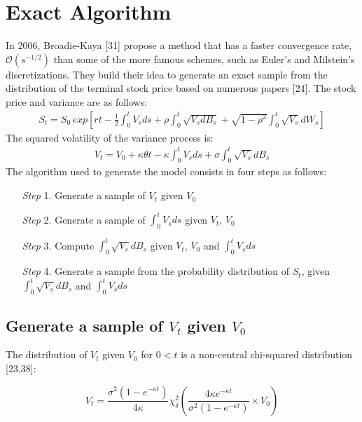 \documentclass[12pt,oneside]{reedthesis}
\theoremstyle{definition}
\theoremstyle{definition}
\theoremstyle{remark}
\begin{document}
  \section{Exact Algorithm}\label{exact-algorithm}
  
  In 2006, Broadie-Kaya {[}31{]} propose a method that has a faster
  convergence rate, \(\mathcal{O} \left( s^{-1/2} \right)\) than some of
  the more famous schemes, such as Euler's and Milstein's discretizations.
  They build their idea to generate an exact sample from the distribution
  of the terminal stock price based on numerous papers {[}24{]}. The stock
  price and variance are as follows:
  \begin{align} \label{eq:ea1}
  S_t = S_0 \, exp \left[ r t - \frac{1}{2} \int_{0}^{t}{V_s ds} + \rho  \int_{0}^{t}{\sqrt{V_s d B_s}} + \sqrt{1 - \rho^2} \int_{0}^{t}{\sqrt{V_s} dW_s}\right]
  \end{align}
  The squared volatility of the variance process is:
  \begin{align} \label{eq:ea2}
  V_t = V_0 + \kappa \theta t - \kappa \int_{0}^{t}{V_s ds} + \sigma \int_{0}^{t}{\sqrt{V_s} dB_s}
  \end{align}
  The algorithm used to generate the model consists in four steps as
  follows:
  \begin{itemize}
  \item [\textit{Step} 1.] Generate a sample of $V_t$ given $V_0$
  \item [\textit{Step} 2.] Generate a sample of $\displaystyle \int_0^t V_sds$ given $V_t$, $V_0$
  \item [\textit{Step} 3.] Compute $\displaystyle \int_0^t \sqrt{V_s}dB_s$ given $V_t$, $V_0$ and $\int_0^t V_sds$
  \item [\textit{Step} 4.] Generate a sample from the probability distribution of $S_t$, given $\displaystyle \int_0^t \sqrt{V_s}dB_s$ and $\displaystyle \int_0^t V_sds$
  \end{itemize}
  \subsection{\texorpdfstring{Generate a sample of \(V_t\) given
  \(V_0\)}{Generate a sample of V\_t given V\_0}}\label{generate-a-sample-of-v_t-given-v_0}
  
  The distribution of \(V_t\) given \(V_0\) for \(0 < t\) is a non-central
  chi-squared distribution {[}23,38{]}:
  
  \[V_t = \frac{\sigma^2 (1-e^{- \kappa t})}{4 \kappa} \chi_{\delta}^{2} \left( \frac{4 \kappa e^{- \kappa t}}{\sigma^2 (1- e^{- \kappa t})} \times V_0\right)\]
  
\end{document}
